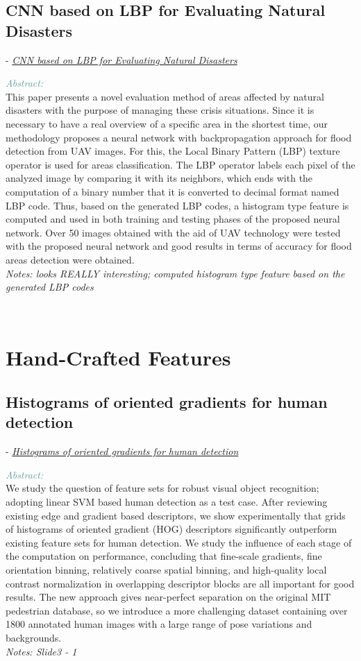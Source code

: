 \documentclass[]{article}
\newcommand{\paperentry}[4]{
            \hangindent=1cm
            \cite{#1} - \href{run:../References/#3}{\textcolor{Sepia}{\textit{#2}}}
            
            \noindent            
            \begin{minipage}[t]{0.1\linewidth}\hfill\end{minipage}
            \begin{minipage}[t]{0.8\linewidth}\textcolor{CadetBlue}{{\textit{Abstract:}}}\\#4\end{minipage}
            \vspace{.25cm}
          }
\begin{document}
\subsection{CNN based on LBP for Evaluating Natural Disasters} 			
\paperentry{Cirneanu2018CNNBO}
{CNN based on LBP for Evaluating Natural Disasters}
{Existing Histogram Layers/disasterhist.pdf}
{This paper presents a novel evaluation method of areas affected by natural disasters with the purpose of managing these crisis situations. Since it is necessary to have a real overview of a specific area in the shortest time, our methodology proposes a neural network with backpropagation approach for flood detection from UAV images. For this, the Local Binary Pattern (LBP) texture operator is used for areas classification. The LBP operator labels each pixel of the analyzed image by comparing it with its neighbors, which ends with the computation of a binary number that it is converted to decimal format named LBP code. Thus, based on the generated LBP codes, a histogram type feature is computed and used in both training and testing phases of the proposed neural network. Over 50 images obtained with the aid of UAV technology were tested with the proposed neural network and good results in terms of accuracy for flood areas detection were obtained. 
	\\\emph{Notes: looks REALLY interesting; computed histogram type feature based on the generated LBP codes}} \\ 

\pagebreak
\section{Hand-Crafted Features}
\subsection{Histograms of oriented gradients for human detection}	
 			\paperentry{Dalal2005gradienthistogram}
 				{Histograms of oriented gradients for human detection}
				 {Existing Histogram Layers/Histograms of oriented gradients for human detection.pdf}
				 {We study the question of feature sets for robust visual object recognition; adopting linear SVM based human detection as a test case. After reviewing existing edge and gradient based descriptors, we show experimentally that grids of histograms of oriented gradient (HOG) descriptors significantly outperform existing feature sets for human detection. We study the influence of each stage of the computation on performance, concluding that fine-scale gradients, fine orientation binning, relatively coarse spatial binning, and high-quality local contrast normalization in overlapping descriptor blocks are all important for good results. The new approach gives near-perfect separation on the original MIT pedestrian database, so we introduce a more challenging dataset containing over 1800 annotated human images with a large range of pose variations and backgrounds.
 				\\\emph{Notes: Slide3 - 1}} \\ 
\end{document}
